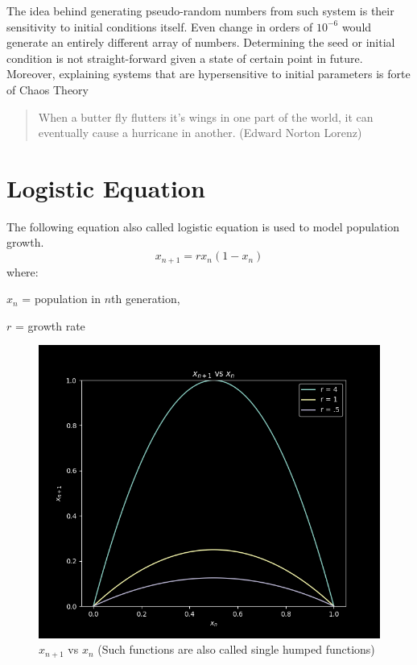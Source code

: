 \documentclass{report}
\begin{document}
The idea behind generating pseudo-random numbers from such system is their sensitivity  to initial conditions itself. Even change in orders of $10^{-6}$ would generate an entirely different array of numbers. Determining the seed or initial condition is not straight-forward given a state of certain point in future. Moreover, explaining systems that are hypersensitive to initial parameters is forte of Chaos Theory

\begin{quote}
When a butter fly flutters it's wings in one part of the world, it can eventually cause a hurricane in another.  (Edward Norton Lorenz)
\end{quote}


\newpage
\section{Logistic Equation}
\raggedright
The following equation also called logistic equation is used to model population growth.
\begin{equation}
x_{n+1} = rx_n(1-x_n) \nonumber
\end{equation}
where:

$x_n$ = population in $n$th generation,

$r$ = growth rate

\begin{figure}[!h]
    \centering
    \includegraphics[scale=.5]{images/xnvsnp1.png}
    \caption{$x_{n+1}$ vs $x_n$ (Such functions are also called single humped functions)}
    \label{fig:my_label}
\end{figure}
\end{document}
